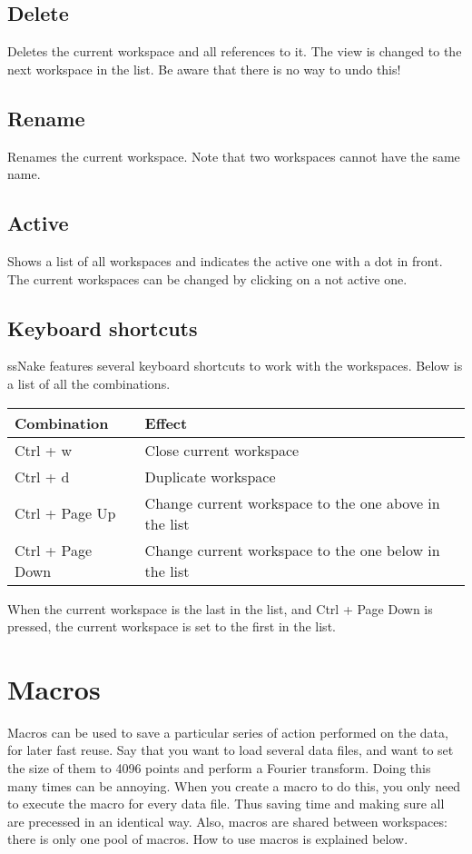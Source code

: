\documentclass[11pt,a4paper]{article}
\begin{document}
\subsection{Delete}
Deletes the current workspace and all references to it. The view is changed to the next workspace in the list. Be aware that there is no way to undo this!

\subsection{Rename}
Renames the current workspace. Note that two workspaces cannot have the same name.

\subsection{Active}
Shows a list of all workspaces and indicates the active one with a dot in front. The current workspaces can be changed by clicking on a not active one.

\subsection{Keyboard shortcuts}
ssNake features several keyboard shortcuts to work with the workspaces. Below is a list of all the combinations.
\begin{center}
\begin{tabular}{ll}
\toprule
Combination & Effect \\
\midrule
\rowcolor{gray!30!white}
Ctrl + w & Close current workspace\\
Ctrl + d & Duplicate workspace\\
\rowcolor{gray!30!white}
Ctrl + Page Up & Change current workspace to the one above in the list\\
Ctrl + Page Down & Change current workspace to the one below in the list\\
\bottomrule
\end{tabular}
\end{center}
When the current workspace is the last in the list, and Ctrl + Page Down is pressed, the current workspace is set to the first in the list.

\section{Macros}
Macros can be used to save a particular series of action performed on the data, for later fast reuse. Say that you want to load several data files, and want to set the size of them to 4096 points and perform a Fourier transform. Doing this many times can be annoying. When you create a macro to do this, you only need to execute the macro for every data file. Thus saving time and making sure all are precessed in an identical way. Also, macros are shared between workspaces: there is only one pool of macros. How to use macros is explained below. 
\end{document}
